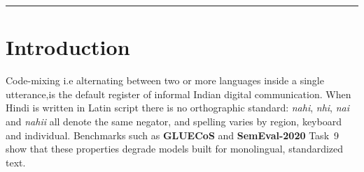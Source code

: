 \documentclass[11pt,a4paper]{article}
\theoremstyle{remark}
\newcommand{\hi}[1]{\textit{#1}}                       %
\begin{document}
\begin{abstract}
\smallskip\noindent
\textbf{Version 1.2.} We separate pretrained knowledge from new data and then
distil. On the exact v1.1 splits, a pretrained Hinglish encoder
\textbf{(hing-roberta-mixed, 278M parameters)} trained only on the v1.1 training split
fixes sentiment (paired $+0.159$ $[+0.056, +0.282]$) but not intent. Adding
1{,}202 generated support messages, 2{,}323 augmented variants and 4{,}000
public tweets (teacher~v2) reaches \textbf{intent $0.966$ }$[0.92, 0.99]$ and solves 29
of 40 pairs in a new hand-written contrast set (v1.1: 10). We then use its soft labels on
\textbf{66{,}166 sentences} train an \textbf{11.88M-parameter student} that keeps the v1.1
hashed pieces, adds four pre-LN Transformer blocks and runs without PyTorch
(ONNX INT8; p95 0.81\,ms, 4.29\,ms at 512 code points). \textbf{The student does
\emph{not} keep the teacher's gains.} Its intent $0.914$ and sentiment $0.916$
cannot be cleanly resolved against v1.1, and sentiment is significantly below teacher~v2
($-0.092$ $[-0.184, -0.020]$). Distillation is not shown to help over a no-KD
student, and sentiment varies across seeds (sd $0.049$). Every evaluation set
remains LLM-generated (\cref{sec:v12}).

\smallskip\noindent
\textbf{Availability.} The source, the released checkpoints and both front
ends are at \url{https://github.com/HarshRaj4343/Polyglots-Shorthand}. A
hosted demo of the deployed student, with every model of this paper
selectable, runs at \url{https://polyglots-shorthand.onrender.com/}
(\cref{sec:v12hosted}).
\end{abstract}

\tableofcontents
\vspace{1em}\hrule

\section{Introduction}
\label{sec:intro}

Code-mixing i.e alternating between two or more languages inside a single
utterance,is the default register of informal Indian digital
communication. When Hindi is written in Latin script
there is no orthographic standard: \hi{nahi}, \hi{nhi}, \hi{nai} and
\hi{nahii} all denote the same negator, and spelling varies by region,
keyboard and individual. Benchmarks such as \textbf{GLUECoS}
and \textbf{SemEval-2020} Task~9 show that these properties
degrade models built for monolingual, standardized text.
\end{document}
